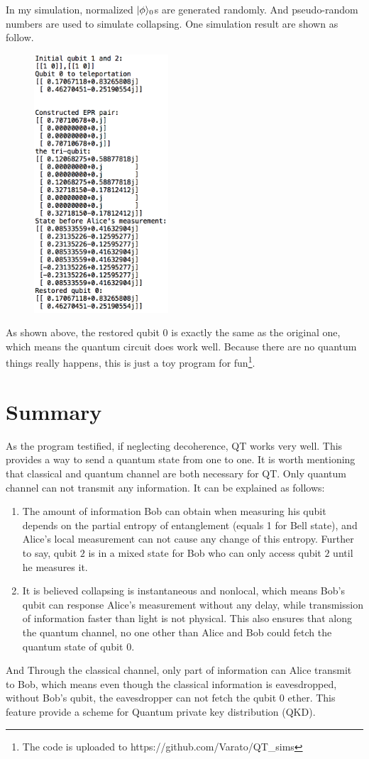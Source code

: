 	In my simulation, normalized $|{\phi} \rangle_0$s are generated randomly. And pseudo-random numbers are used to simulate collapsing. One simulation result 
	are shown as follow.
	\begin{figure}[H]
	\centering
	\includegraphics[width=5cm]{img/simRes.png}
    \end{figure}
    As shown above, the restored qubit $0$ is exactly the same as the original one, which means the quantum circuit does work well.
    Because there are no quantum things really happens, 
    this is just a toy program for fun\footnote{
    The code is uploaded to https://github.com/Varato/QT\_sims}.
     
\section*{Summary}
	As the program testified, if neglecting decoherence, QT works very well. 
	This provides a way to send a quantum state from one to one. 
	It is worth mentioning that classical and quantum channel are both necessary for QT.
	Only quantum channel can not transmit any information. It can be explained as follows:
	\begin{enumerate}
	\item The amount of information Bob can obtain when measuring his qubit depends on 
	the partial entropy of entanglement (equals 1 for Bell state), and Alice's local measurement can not cause any change of this entropy. Further to say, qubit $2$ is in a mixed state for Bob who can only access qubit $2$ until he measures it.
	\item It is believed collapsing is instantaneous and nonlocal, which means Bob's qubit
	can response Alice's measurement without any delay, while transmission of
	information faster than light is not physical. This also ensures that along the 
	quantum channel, no one other than Alice and Bob could fetch the quantum state of  qubit $0$.
	\end{enumerate}
	And Through the classical channel, only part of information can Alice transmit to Bob, which means even though the classical information is eavesdropped, without Bob's
	qubit, the eavesdropper can not fetch the qubit $0$ ether. This feature provide a scheme for Quantum private key distribution (QKD)\cite{art:QKD}. 

